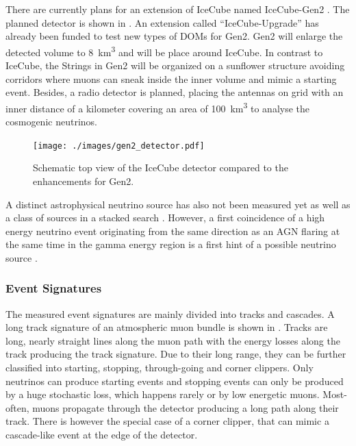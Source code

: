 There are currently plans for an extension of IceCube named IceCube-Gen2 \cite{IceCube20Gen2}.
The planned detector is shown in .
An extension called \enquote{IceCube-Upgrade} has already been funded to test new types of DOMs for Gen2.
Gen2 will enlarge the detected volume to \SI{8}{\cubic\kilo\meter} and will be place around IceCube.
In contrast to IceCube, the Strings in Gen2 will be organized on a sunflower structure avoiding corridors where muons can sneak inside the inner volume and mimic a starting event.
Besides, a radio detector is planned, placing the antennas on grid with an inner distance of a kilometer covering an area of \SI{100}{\cubic\kilo\meter} to analyse the cosmogenic neutrinos.
\begin{figure}
    \centering
    \texttt{[image: ./images/gen2\_detector.pdf]}
    \caption{Schematic top view of the IceCube detector compared to the enhancements for Gen2. \cite{IceCube20Gen2}}
    \label{fig:detect_gen2}
\end{figure}

A distinct astrophysical neutrino source has also not been measured yet as well as a class of sources in a stacked search \cite{IceCube20PointSource, IceCube17BlazarStacking}.
However, a first coincidence of a high energy neutrino event originating from the same direction as an AGN flaring at the same time in the gamma energy region is a first hint of a possible neutrino source \cite{IceCube18MMA, IceCube18TXS}.

\subsubsection{Event Signatures}

The measured event signatures are mainly divided into tracks and cascades.
A long track signature of an atmospheric muon bundle is shown in .
Tracks are long, nearly straight lines along the muon path with the energy losses along the track producing the track signature.
Due to their long range, they can be further classified into starting, stopping, through-going and corner clippers.
Only neutrinos can produce starting events and stopping events can only be produced by a huge stochastic loss, which happens rarely or by low energetic muons.
Most-often, muons propagate through the detector producing a long path along their track.
There is however the special case of a corner clipper, that can mimic a cascade-like event at the edge of the detector.

